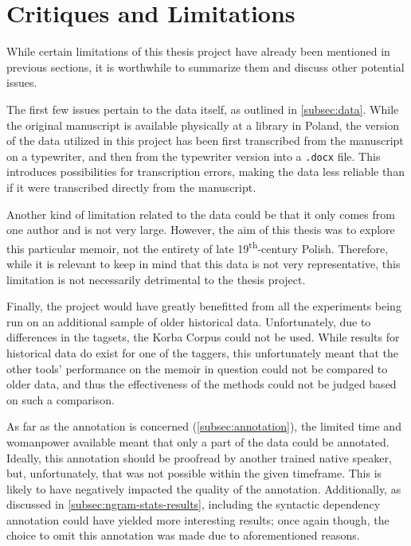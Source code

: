 \section{Critiques and Limitations}
\label{sec:critiques}

While certain limitations of this thesis project have already been mentioned in previous sections, it is worthwhile to summarize them and discuss other potential issues.

The first few issues pertain to the data itself, as outlined in \autoref{subsec:data}. While the original manuscript is available physically at a library in Poland, the version of the data utilized in this project has been first transcribed from the manuscript on a typewriter, and then from the typewriter version into a \texttt{.docx} file. This introduces possibilities for transcription errors, making the data less reliable than if it were transcribed directly from the manuscript. 

Another kind of limitation related to the data could be that it only comes from one author and is not very large. However, the aim of this thesis was to explore this particular memoir, not the entirety of late 19\textsuperscript{th}-century Polish. Therefore, while it is relevant to keep in mind that this data is not very representative, this limitation is not necessarily detrimental to the thesis project.

Finally, the project would have greatly benefitted from all the experiments being run on an additional sample of older historical data. Unfortunately, due to differences in the tagsets, the Korba Corpus could not be used. While results for historical data do exist for one of the taggers, this unfortunately meant that the other tools' performance on the memoir in question could not be compared to older data, and thus the effectiveness of the methods could not be judged based on such a comparison.

As far as the annotation is concerned (\autoref{subsec:annotation}), the limited time and womanpower available meant that only a part of the data could be annotated. Ideally, this annotation should be proofread by another trained native speaker, but, unfortunately, that was not possible within the given timeframe. This is likely to have negatively impacted the quality of the annotation. Additionally, as discussed in \autoref{subsec:ngram-stats-results}, including the syntactic dependency annotation could have yielded more interesting results; once again though, the choice to omit this annotation was made due to aforementioned reasons.

